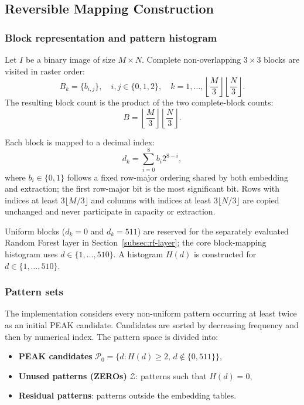 \documentclass[a4paper,fleqn]{cas-dc}
\newcommand{\RevisionAddBegin}{\begingroup\color{revisionblue}}
\newcommand{\RevisionAddEnd}{\endgroup}
\begin{document}
\subsection{Reversible Mapping Construction}

\subsubsection*{Block representation and pattern histogram}

Let $I$ be a binary image of size $M\times N$. Complete non-overlapping
$3\times3$ blocks are visited in raster order:
\begin{equation}
B_k=\{b_{i,j}\},\quad i,j\in\{0,1,2\},\quad
k=1,\ldots,\left\lfloor\frac{M}{3}\right\rfloor
\left\lfloor\frac{N}{3}\right\rfloor .
\label{eq:block-index}
\end{equation}
The resulting block count is the product of the two complete-block counts:
\begin{equation}
B=\left\lfloor\frac{M}{3}\right\rfloor
  \left\lfloor\frac{N}{3}\right\rfloor .
\label{eq:block-count}
\end{equation}

Each block is mapped to a decimal index:
\begin{equation}
d_k = \sum_{i=0}^{8} b_i 2^{8-i},
\label{eq:pattern-index}
\end{equation}
where $b_i \in \{0,1\}$ follows a fixed row-major ordering shared by both
embedding and extraction; the first row-major bit is the most significant bit.
Rows with indices at least $3\lfloor M/3\rfloor$ and columns with indices at
least $3\lfloor N/3\rfloor$ are copied unchanged and never participate in
capacity or extraction.

Uniform blocks ($d_k = 0$ and $d_k = 511$) are reserved for the separately
evaluated Random Forest layer in Section~\ref{subsec:rf-layer}; the core
block-mapping histogram uses $d\in\{1,\ldots,510\}$.
A histogram $H(d)$ is constructed for $d \in \{1,\ldots,510\}$.

\subsubsection*{Pattern sets}

The implementation considers every non-uniform pattern occurring at least
twice as an initial PEAK candidate. Candidates are sorted by decreasing
frequency and then by numerical index. The pattern space is divided into:
\begin{itemize}
    \item \textbf{PEAK candidates} $\mathcal{P}_0=\{d:H(d)\geq2,\,
    d\notin\{0,511\}\}$,
    \item \textbf{Unused patterns (ZEROs)} $\mathcal{Z}$: patterns such that $H(d)=0$,
\RevisionAddBegin
    \item \textbf{Residual patterns}: patterns outside the embedding tables.
\RevisionAddEnd
\end{itemize}
\end{document}
